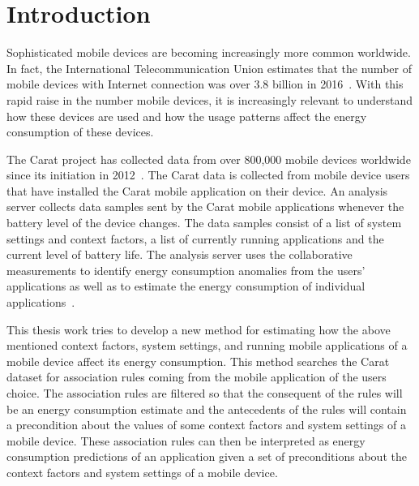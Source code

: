 \section{Introduction}


Sophisticated mobile devices are becoming increasingly more common worldwide. In fact, the International Telecommunication Union estimates that the number of mobile devices with Internet connection was over 3.8 billion in 2016~\cite{ITUstats}. With this rapid raise in the number mobile devices, it is increasingly relevant to understand how these devices are used and how the usage patterns affect the energy consumption of these devices.    

The Carat project has collected data from over 800,000 mobile devices worldwide since its initiation in 2012~\cite{7840871}. The Carat data is collected from mobile device users that have installed the Carat mobile application on their device. An analysis server collects data samples sent by the Carat mobile applications whenever the battery level of the device changes. The data samples consist of a list of system settings and context factors, a list of currently running applications and the current level of battery life. The analysis server uses the collaborative measurements to identify energy consumption anomalies from the users' applications as well as to estimate the energy consumption of individual applications~\cite{Oliner:2013:CCE:2517351.2517354}.

This thesis work tries to develop a new method for estimating how the above mentioned context factors, system settings, and running mobile applications of a mobile device affect its energy consumption. This method searches the Carat dataset for association rules coming from the mobile application of the users choice. The association rules are filtered so that the consequent of the rules will be an energy consumption estimate and the antecedents of the rules will contain a precondition about the values of some context factors and system settings of a mobile device. These association rules can then be interpreted as energy consumption predictions of an application given a set of preconditions about the context factors and system settings of a mobile device.      


